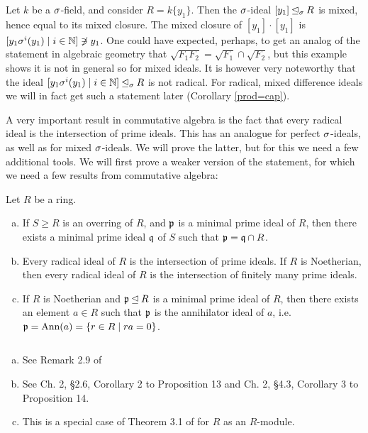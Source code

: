 \begin{ex} %
Let $k$ be a $\sigma$-field, and consider $R = k\{y_1\}$. Then the $\sigma$-ideal $[y_1] \unlhd_{\sigma} R$ is mixed, hence equal to its mixed closure.
The mixed closure of $[y_1] \cdot [y_1]$ is $[ y_1 \sigma^i(y_1) \mid i \in \mathbb{N} ] \not \ni y_1$.
One could have expected, perhaps, to get an analog of the statement in algebraic geometry that $\sqrt{F_1  F_2 } = \sqrt{F_1} \cap \sqrt{F_2}$, but this example shows it is not in general so for mixed ideals.
It is however very noteworthy that the ideal $[ y_1 \sigma^i(y_1) \mid i \in \mathbb{N} ] \unlhd_{\sigma} R$ is not radical. For radical, mixed difference ideals we will in fact get such a statement later (Corollary \ref{prod=cap}).
\end{ex}

A very important result in commutative algebra is the fact that every radical ideal is the intersection of prime ideals. This has an analogue for perfect $\sigma$-ideals, as well as for mixed $\sigma$-ideals. 
We will prove the latter, but for this we need a few additional tools. We will first prove a weaker version of the statement, for which we need a few results from commutative algebra:

\begin{lem}\label{commalg}
Let $R$ be a ring. 
\begin{enumerate}[(a)]
\item If $S \geq R$ is an overring of $R$, and $\mathfrak{p}$ is a minimal prime ideal of $R$, then there exists a minimal prime ideal $\mathfrak{q}$ of $S$ such that $\mathfrak{p} = \mathfrak{q} \cap R$.
\item Every radical ideal of $R$ is the intersection of prime ideals. If $R$ is Noetherian, then every radical ideal of $R$ is the intersection of finitely many prime ideals.
\item If $R$ is Noetherian and $\mathfrak{p} \unlhd R$ is a minimal prime ideal of $R$, then there exists an element $a \in R$ such that $\mathfrak{p}$ is the annihilator ideal of $a$, i.e. $\mathfrak{p} = \text{Ann}(a) = \{ r \in R \mid ra = 0 \}$.
\end{enumerate}
\begin{bew} $~$
\begin{enumerate}[(a)]
\item See Remark 2.9 of \cite{hrushovski}
\item See \cite{bourbaki} Ch. 2, \S 2.6, Corollary 2 to Proposition 13 and Ch. 2, \S 4.3, Corollary 3 to Proposition 14.
\item This is a special case of Theorem 3.1 of \cite{eisenbud} for $R$ as an $R$-module.
\end{enumerate}
\end{bew}
\end{lem}


